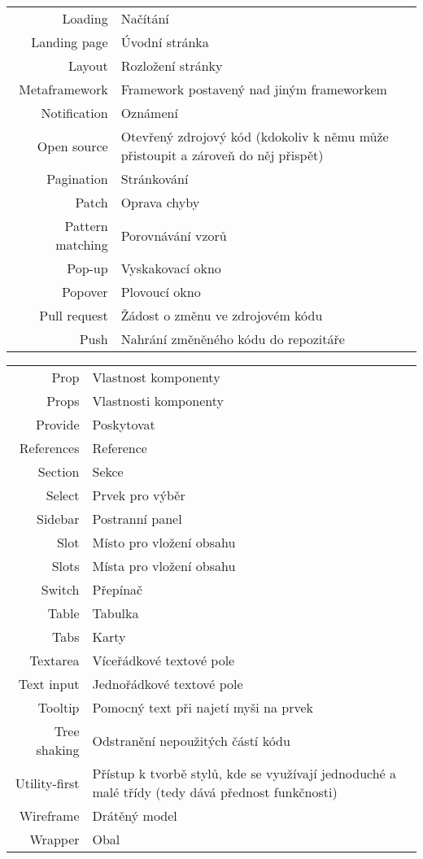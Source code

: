 \begin{tabular}{rp{}}
    Loading             & Načítání \tabularnewline
    Landing page        & Úvodní stránka \tabularnewline
    Layout              & Rozložení stránky \tabularnewline
    Metaframework       & Framework postavený nad jiným frameworkem \tabularnewline
    Notification        & Oznámení \tabularnewline
    Open source         & Otevřený zdrojový kód (kdokoliv k němu může přistoupit a zároveň do něj přispět) \tabularnewline
    Pagination          & Stránkování \tabularnewline
    Patch               & Oprava chyby \tabularnewline
    Pattern matching    & Porovnávání vzorů \tabularnewline
    Pop-up              & Vyskakovací okno \tabularnewline
    Popover             & Plovoucí okno \tabularnewline
    Pull request        & Žádost o změnu ve zdrojovém kódu \tabularnewline
    Push                & Nahrání změněného kódu do repozitáře \tabularnewline
\end{tabular}

\begin{tabular}{rp{}}
    Prop                & Vlastnost komponenty \tabularnewline
    Props               & Vlastnosti komponenty \tabularnewline
    Provide            & Poskytovat \tabularnewline
    References          & Reference \tabularnewline
    Section             & Sekce \tabularnewline
    Select              & Prvek pro výběr \tabularnewline
    Sidebar             & Postranní panel \tabularnewline
    Slot                & Místo pro vložení obsahu \tabularnewline
    Slots               & Místa pro vložení obsahu \tabularnewline
    Switch              & Přepínač \tabularnewline
    Table               & Tabulka \tabularnewline
    Tabs                & Karty \tabularnewline
    Textarea            & Víceřádkové textové pole \tabularnewline
    Text input          & Jednořádkové textové pole \tabularnewline
    Tooltip             & Pomocný text při najetí myši na prvek \tabularnewline
    Tree shaking        & Odstranění nepoužitých částí kódu \tabularnewline
    Utility-first       & Přístup k tvorbě stylů, kde se využívají jednoduché a malé třídy (tedy dává přednost funkčnosti) \tabularnewline
    Wireframe           & Drátěný model \tabularnewline
    Wrapper             & Obal \tabularnewline
\end{tabular}
